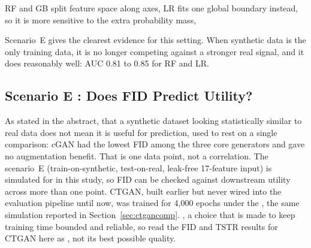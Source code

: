 
 RF and GB split feature space along axes,  LR fits one global boundary instead, so it is more sensitive to the extra probability mass, 

Scenario~E gives the clearest evidence for this setting. When synthetic data is the only training data, it is no longer competing against a stronger real signal, and it does reasonably well: AUC 0.81 to 0.85 for RF and LR. 

\subsection{Scenario E : Does FID Predict Utility?}
\label{sec:sixgen}

As stated in the abstract, that a synthetic dataset looking statistically similar to real data does not mean it is useful for prediction, used to rest on a single comparison: cGAN had the lowest FID among the three core generators and gave no augmentation benefit. That is one data point, not a correlation. The scenario~E (train-on-synthetic, test-on-real, leak-free 17-feature input) is simulated for  in this study, so FID can be checked against downstream utility across more than one point. CTGAN, built earlier but never wired into the evaluation pipeline until now, was trained for 4,000 epochs under the , the same simulation reported in Section~\ref{sec:ctgancomp}. , a choice that is made to keep training time bounded and reliable, so read the FID and TSTR results for CTGAN here as , not its best possible quality.

